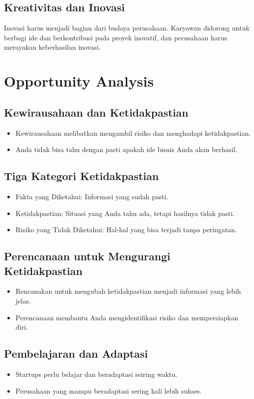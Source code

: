 \documentclass{article}
\begin{document}
\subsection{Kreativitas dan Inovasi}
Inovasi harus menjadi bagian dari budaya perusahaan. Karyawan didorong untuk berbagi ide dan berkontribusi pada proyek inovatif, dan perusahaan harus merayakan keberhasilan inovasi.

\newpage

\section{Opportunity Analysis}
\subsection{Kewirausahaan dan Ketidakpastian}
\begin{itemize}
    \item Kewirausahaan melibatkan mengambil risiko dan menghadapi ketidakpastian.
    \item Anda tidak bisa tahu dengan pasti apakah ide bisnis Anda akan berhasil.
\end{itemize}

\subsection{Tiga Kategori Ketidakpastian}
\begin{itemize}
    \item Fakta yang Diketahui: Informasi yang sudah pasti.
    \item Ketidakpastian: Situasi yang Anda tahu ada, tetapi hasilnya tidak pasti.
    \item Risiko yang Tidak Diketahui: Hal-hal yang bisa terjadi tanpa peringatan.
\end{itemize}

\subsection{Perencanaan untuk Mengurangi Ketidakpastian}
\begin{itemize}
    \item Rencanakan untuk mengubah ketidakpastian menjadi informasi yang lebih jelas.
    \item Perencanaan membantu Anda mengidentifikasi risiko dan mempersiapkan diri.
\end{itemize}

\subsection{Pembelajaran dan Adaptasi}
\begin{itemize}
    \item Startups perlu belajar dan beradaptasi seiring waktu.
    \item Perusahaan yang mampu beradaptasi sering kali lebih sukses.
\end{itemize}
\end{document}
